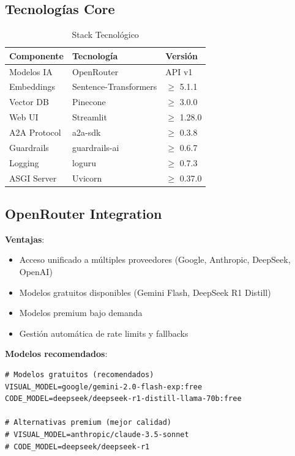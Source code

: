 \documentclass[12pt,a4paper]{article}
\begin{document}
\subsection{Tecnologías Core}

\begin{table}[H]
\centering
\caption{Stack Tecnológico}
\begin{tabular}{lll}
\toprule
\textbf{Componente} & \textbf{Tecnología} & \textbf{Versión} \\
\midrule
Modelos IA & OpenRouter & API v1 \\
Embeddings & Sentence-Transformers & $\geq$ 5.1.1 \\
Vector DB & Pinecone & $\geq$ 3.0.0 \\
Web UI & Streamlit & $\geq$ 1.28.0 \\
A2A Protocol & a2a-sdk & $\geq$ 0.3.8 \\
Guardrails & guardrails-ai & $\geq$ 0.6.7 \\
Logging & loguru & $\geq$ 0.7.3 \\
ASGI Server & Uvicorn & $\geq$ 0.37.0 \\
\bottomrule
\end{tabular}
\end{table}

\subsection{OpenRouter Integration}

\textbf{Ventajas}:
\begin{itemize}
    \item Acceso unificado a múltiples proveedores (Google, Anthropic, DeepSeek, OpenAI)
    \item Modelos gratuitos disponibles (Gemini Flash, DeepSeek R1 Distill)
    \item Modelos premium bajo demanda
    \item Gestión automática de rate limits y fallbacks
\end{itemize}

\textbf{Modelos recomendados}:
\begin{lstlisting}[caption={Configuracion de Modelos en .env}]
# Modelos gratuitos (recomendados)
VISUAL_MODEL=google/gemini-2.0-flash-exp:free
CODE_MODEL=deepseek/deepseek-r1-distill-llama-70b:free

# Alternativas premium (mejor calidad)
# VISUAL_MODEL=anthropic/claude-3.5-sonnet
# CODE_MODEL=deepseek/deepseek-r1
\end{lstlisting}
\end{document}
